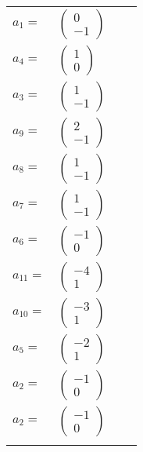 \documentclass[1p]{elsarticle_modified}
\theoremstyle{definition}
\begin{document}
\begin{tabular}{m{7pt} m{180pt} m{7pt} m{180pt} }
\flushright $a_{1}=$&$\begin{pmatrix}0\\-1\end{pmatrix}$ \\
\flushright $a_{4}=$&$\begin{pmatrix}1\\0\end{pmatrix}$ \\
\flushright $a_{3}=$&$\begin{pmatrix}1\\-1\end{pmatrix}$ \\
\flushright $a_{9}=$&$\begin{pmatrix}2\\-1\end{pmatrix}$ \\
\flushright $a_{8}=$&$\begin{pmatrix}1\\-1\end{pmatrix}$ \\
\flushright $a_{7}=$&$\begin{pmatrix}1\\-1\end{pmatrix}$ \\
\flushright $a_{6}=$&$\begin{pmatrix}-1\\0\end{pmatrix}$ \\
\flushright $a_{11}=$&$\begin{pmatrix}-4\\1\end{pmatrix}$ \\
\flushright $a_{10}=$&$\begin{pmatrix}-3\\1\end{pmatrix}$ \\
\flushright $a_{5}=$&$\begin{pmatrix}-2\\1\end{pmatrix}$ \\
\flushright $a_{2}=$&$\begin{pmatrix}-1\\0\end{pmatrix}$\\ \flushright $a_{2}=$&$\begin{pmatrix}-1\\0\end{pmatrix}$\\&\end{tabular}
\end{document}

